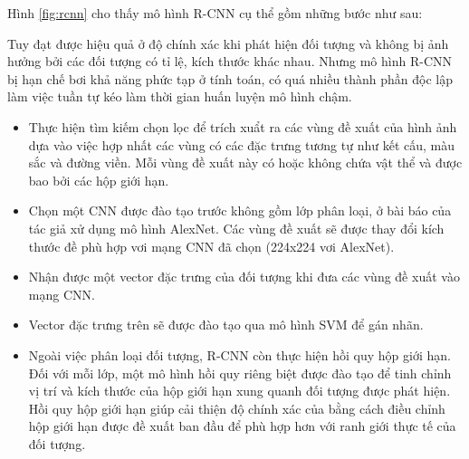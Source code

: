 \documentclass[../the.tex]{subfiles}
\begin{document}
{\fontsize{13}{12} \selectfont
Hình \ref{fig:rcnn} cho thấy mô hình R-CNN cụ thể gồm những bước như sau: 



{\fontsize{13}{12} \selectfont 
Tuy đạt được hiệu quả ở độ chính xác khi phát hiện đối tượng và không bị ảnh hưởng bởi các đối tượng có tỉ lệ, kích thước khác nhau. 
Nhưng mô hình R-CNN bị hạn chế bơi khả năng phức tạp ở tính toán, có quá nhiều thành phần độc lập làm việc tuần tự kéo làm thời gian huấn luyện mô hình chậm.
}
\begin{itemize}
	\item Thực hiện tìm kiếm chọn lọc để trích xuẩt ra các vùng đề xuất của hình ảnh dựa vào việc hợp nhất các vùng có các đặc trưng tương tự như kết cấu, màu sắc và đường viền. Mỗi vùng đề xuất này có hoặc không chứa vật thể và được bao bởi các hộp giới hạn.
	\item Chọn một CNN được đào tạo trước không gồm lớp phân loại, ở bài báo của tác giả xử dụng mô hình AlexNet. Các vùng đề xuất sẽ được thay đổi kích thước đề phù hợp vơi mạng CNN đã chọn (224x224 vơi AlexNet).
	\item Nhận được một vector đặc trưng của đối tượng khi đưa các vùng đề xuất vào mạng CNN.
	\item Vector đặc trưng trên sẽ được đào tạo qua mô hình SVM để gán nhãn.
	\item Ngoài việc phân loại đối tượng, R-CNN còn thực hiện hồi quy hộp giới hạn. Đối với mỗi lớp, một mô hình hồi quy riêng biệt được đào tạo để tinh chỉnh vị trí và kích thước của hộp giới hạn xung quanh đối tượng được phát hiện. Hồi quy hộp giới hạn giúp cải thiện độ chính xác của bằng cách điều chỉnh hộp giới hạn được đề xuất ban đầu để phù hợp hơn với ranh giới thực tế của đối tượng.
\end{itemize}
}
\bigskip
\end{document}
